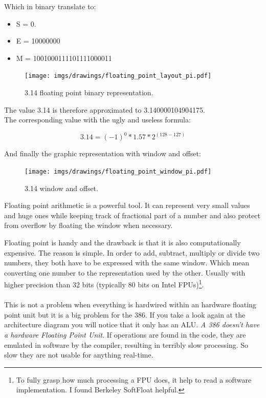 \documentclass[book.tex]{subfiles}
\begin{document}
Which in binary translate to:

\begin{itemize}
\item S = 0.
\item E = 10000000
\item M = 1001000111101111000011
\end{itemize}

\begin{figure}[H]
\centering
\texttt{[image: imgs/drawings/floating\_point\_layout\_pi.pdf]}
\caption{3.14 floating point binary representation.}
\label{fig:fp_internals}
\end{figure}
  \bigskip

The value 3.14 is therefore approximated to 3.140000104904175.\\

The corresponding value with the ugly and useless formula:

\begin{equation}
3.14 = (-1)^0 * 1.57 * 2^{(128-127)}
\end{equation}

\bigskip

And finally the graphic representation with window and offset:\\

\begin{figure}[H]
\centering
\texttt{[image: imgs/drawings/floating\_point\_window\_pi.pdf]}

\caption{3.14 window and offset.}
\label{fig:fp_internals}
\end{figure}
  \bigskip

Floating point arithmetic is a powerful tool. It can represent very small values and huge ones while keeping track of fractional part of a number and also protect from overflow by floating the window when necessary.\\
\par
Floating point is handy and the drawback is that it is also computationally expensive. The reason is simple. In order to add, subtract, multiply or divide two numbers, they both have to be expressed with the same window. Which mean converting one number to the representation used by the other. Usually with higher precision than 32 bits (typically 80 bits on Intel FPUs)\footnote{To fully grasp how much processing a FPU does, it help to read a software implementation. I found Berkeley SoftFloat helpful.}.\\
\\
This is not a problem when everything is hardwired within an hardware floating point unit but it is a big problem for the 386. If you take a look again at the architecture diagram you will notice that it only has an ALU. \emph{A 386 doesn't have a hardware Floating Point Unit}. If  operations are found in the code, they are emulated in software by the compiler, resulting in terribly slow processing. So slow they are not usable for anything real-time.\\ 
\par
\end{document}
